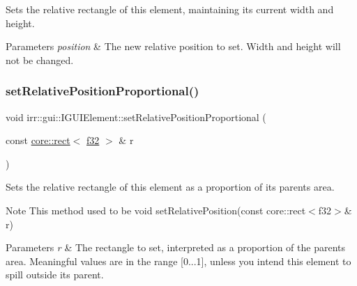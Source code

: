 Sets the relative rectangle of this element, maintaining its current width and height. 


\begin{DoxyParams}{Parameters}
{\em position} & The new relative position to set. Width and height will not be changed. \\
\hline
\end{DoxyParams}
\mbox{\label{classirr_1_1gui_1_1IGUIElement_aa67e02ab54db1068e7c057721d2f24a5}} 
\subsubsection{\texorpdfstring{set\+Relative\+Position\+Proportional()}{setRelativePositionProportional()}\hspace{0.1cm}{\footnotesize\ttfamily [1/2]}}
{\footnotesize\ttfamily void irr\+::gui\+::\+I\+G\+U\+I\+Element\+::set\+Relative\+Position\+Proportional (\begin{DoxyParamCaption}\item[{const \hyperlink{classirr_1_1core_1_1rect}{core\+::rect}$<$ \hyperlink{namespaceirr_a0277be98d67dc26ff93b1a6a1d086b07}{f32} $>$ \&}]{r }\end{DoxyParamCaption})\hspace{0.3cm}{\ttfamily [inline]}}



Sets the relative rectangle of this element as a proportion of its parent\textquotesingle{}s area. 

\begin{DoxyNote}{Note}
This method used to be \textquotesingle{}void set\+Relative\+Position(const core\+::rect$<$f32$>$\& r)\textquotesingle{} 
\end{DoxyNote}

\begin{DoxyParams}{Parameters}
{\em r} & The rectangle to set, interpreted as a proportion of the parent\textquotesingle{}s area. Meaningful values are in the range \mbox{[}0...1\mbox{]}, unless you intend this element to spill outside its parent. \\
\hline
\end{DoxyParams}
\mbox{\label{classirr_1_1gui_1_1IGUIElement_aa67e02ab54db1068e7c057721d2f24a5}} 
